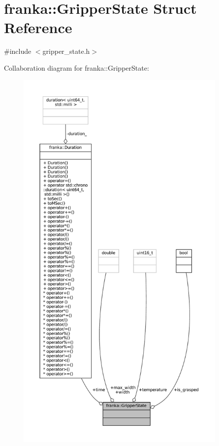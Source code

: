 \hypertarget{structfranka_1_1GripperState}{}\section{franka\+:\+:Gripper\+State Struct Reference}
\label{structfranka_1_1GripperState}


{\ttfamily \#include $<$gripper\+\_\+state.\+h$>$}



Collaboration diagram for franka\+:\+:Gripper\+State\+:
\nopagebreak
\begin{figure}[H]
\begin{center}
\leavevmode
\includegraphics[height=550pt]{structfranka_1_1GripperState__coll__graph}
\end{center}
\end{figure}
